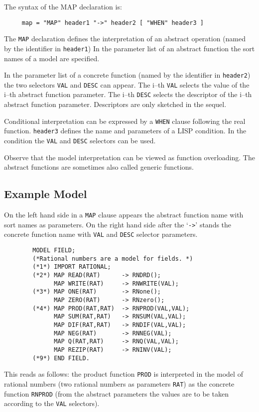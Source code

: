 The syntax of the MAP declaration is:
\begin{verbatim}
     map = "MAP" header1 "->" header2 [ "WHEN" header3 ]
\end{verbatim}
The \verb/MAP/ declaration defines the 
interpretation of an abstract operation 
(named by the identifier in \verb/header1/)
In the parameter list of an abstract function 
the sort names of a model are specified.

In the parameter list of a concrete function 
(named by the identifier in \verb/header2/)
the two selectors \verb/VAL/ and \verb/DESC/ can appear.
The i--th \verb/VAL/ selects the value of the 
i--th abstract function parameter. 
The i--th \verb/DESC/ selects the descriptor of the 
i--th abstract function parameter. 
Descriptors are only sketched in the sequel.

Conditional interpretation can be expressed by 
a \verb/WHEN/ clause following the real function.
\verb/header3/ defines the name and parameters of a 
LISP condition.
In the condition the \verb/VAL/ and \verb/DESC/ selectors 
can be used.

Observe that the model interpretation can 
be viewed as function overloading. 
The abstract functions are sometimes also called 
generic functions.

\subsection{Example Model}

On the left hand side in a \verb/MAP/ clause appears the 
abstract function name with sort names as parameters.
On the right hand side after the `\verb/->/' stands the 
concrete function name with \verb/VAL/ and \verb/DESC/ 
selector parameters. 
\begin{verbatim}
        MODEL FIELD;
        (*Rational numbers are a model for fields. *)
        (*1*) IMPORT RATIONAL;
        (*2*) MAP READ(RAT)      -> RNDRD(); 
              MAP WRITE(RAT)     -> RNWRITE(VAL);
        (*3*) MAP ONE(RAT)       -> RNone();
              MAP ZERO(RAT)      -> RNzero();
        (*4*) MAP PROD(RAT,RAT)  -> RNPROD(VAL,VAL);
              MAP SUM(RAT,RAT)   -> RNSUM(VAL,VAL);
              MAP DIF(RAT,RAT)   -> RNDIF(VAL,VAL);
              MAP NEG(RAT)       -> RNNEG(VAL);
              MAP Q(RAT,RAT)     -> RNQ(VAL,VAL);
              MAP REZIP(RAT)     -> RNINV(VAL);
        (*9*) END FIELD.
\end{verbatim}
This reads as follows:
the product function \verb/PROD/ is 
interpreted in the model of rational numbers 
(two rational numbers as parameters \verb/RAT/)  
as the concrete function \verb/RNPROD/ 
(from the abstract parameters the values are to be taken 
according to the \verb/VAL/ selectors).

